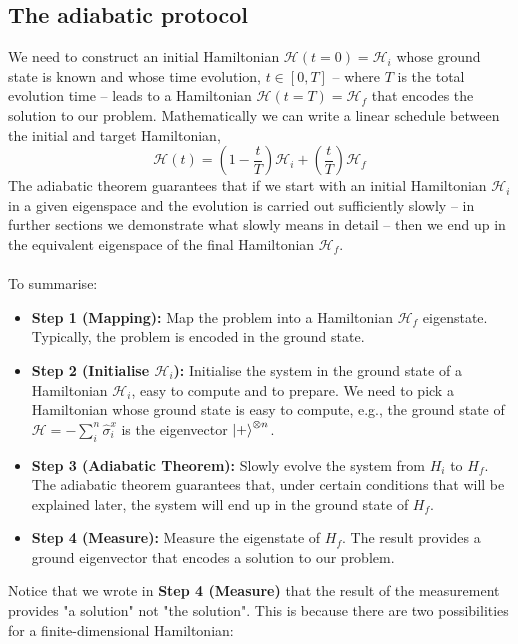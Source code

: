 \subsection{The adiabatic protocol}
We need to construct an initial Hamiltonian $\mathcal{H}(t=0) = \mathcal{H}_{i}$ whose ground state is known and whose time evolution, $t \in \left[0,T\right]$ -- where $T$ is the total evolution time -- leads to a Hamiltonian $\mathcal{H}(t=T) = \mathcal{H}_{f}$ that encodes the solution to our problem. Mathematically we can write a linear schedule between the initial and target Hamiltonian,
\begin{equation}
\label{eq:Htime}
    \mathcal{H}(t) = \left(1-\frac{t}{T}\right)\mathcal{H}_{i} + \left(\frac{t}{T} \right)\mathcal{H}_{f}
\end{equation}
The adiabatic theorem guarantees that if we start with an initial Hamiltonian $\mathcal{H}_{i}$ in a given eigenspace and the evolution is carried out sufficiently slowly -- in further sections we demonstrate what slowly means in detail -- then we end up in the equivalent eigenspace of the final Hamiltonian $\mathcal{H}_{f}$. \\\\
To summarise:
\begin{itemize}
    \item \textbf{Step 1 (Mapping):} Map the problem into a Hamiltonian $\mathcal{H}_{f}$ eigenstate. Typically, the problem is encoded in the ground state.
    \item \textbf{Step 2 (Initialise $\mathcal{H}_{i}$):} Initialise the system in the ground state of a Hamiltonian $\mathcal{H}_{i}$, easy to compute and to prepare. We need to pick a Hamiltonian whose ground state is easy to compute, e.g., the ground state of $\mathcal{H} = - \sum_{i}^{n}\hat{\sigma}_{i}^{x}$ is the eigenvector $\ket{+}^{\otimes n}$.
    \item \textbf{Step 3 (Adiabatic Theorem):} Slowly evolve the system from $H_{i}$ to $H_{f}$. The adiabatic theorem guarantees that, under certain conditions that will be explained later, the system will end up in the ground state of $H_{f}$.
    \item \textbf{Step 4 (Measure):} Measure the eigenstate of $H_{f}$. The result provides a ground eigenvector that encodes a solution to our problem.
\end{itemize}
Notice that we wrote in \textbf{Step 4 (Measure)} that the result of the measurement provides "a solution" not "the solution". This is because there are two possibilities for a finite-dimensional Hamiltonian:
